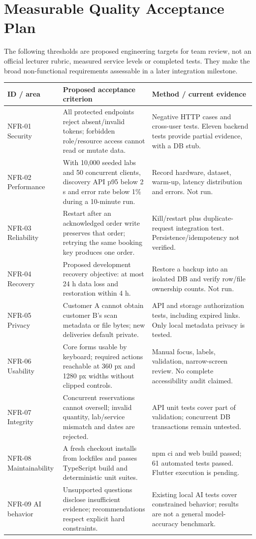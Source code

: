\section{Measurable Quality Acceptance Plan}
The following thresholds are proposed engineering targets for team review,
not an official lecturer rubric, measured service levels or completed tests.
They make the broad non-functional requirements assessable in a later
integration milestone.
\begin{longtable}{p{}p{}p{}}
\toprule\textbf{ID / area} & \textbf{Proposed acceptance criterion} & \textbf{Method / current evidence}\\\midrule\endhead
NFR-01 Security & All protected endpoints reject absent/invalid tokens; forbidden role/resource access cannot read or mutate data. & Negative HTTP cases and cross-user tests. Eleven backend tests provide partial evidence, with a DB stub.\\
NFR-02 Performance & With 10,000 seeded labs and 50 concurrent clients, discovery API p95 below 2 s and error rate below 1\% during a 10-minute run. & Record hardware, dataset, warm-up, latency distribution and errors. Not run.\\
NFR-03 Reliability & Restart after an acknowledged order write preserves that order; retrying the same booking key produces one order. & Kill/restart plus duplicate-request integration test. Persistence/idempotency not verified.\\
NFR-04 Recovery & Proposed development recovery objective: at most 24 h data loss and restoration within 4 h. & Restore a backup into an isolated DB and verify row/file ownership counts. Not run.\\
NFR-05 Privacy & Customer A cannot obtain customer B's scan metadata or file bytes; new deliveries default private. & API and storage authorization tests, including expired links. Only local metadata privacy is tested.\\
NFR-06 Usability & Core forms usable by keyboard; required actions reachable at 360 px and 1280 px widths without clipped controls. & Manual focus, labels, validation, narrow-screen review. No complete accessibility audit claimed.\\
NFR-07 Integrity & Concurrent reservations cannot oversell; invalid quantity, lab/service mismatch and dates are rejected. & API unit tests cover part of validation; concurrent DB transactions remain untested.\\
NFR-08 Maintainability & A fresh checkout installs from lockfiles and passes TypeScript build and deterministic unit suites. & npm ci and web build passed; 61 automated tests passed. Flutter execution is pending.\\
NFR-09 AI behavior & Unsupported questions disclose insufficient evidence; recommendations respect explicit hard constraints. & Existing local AI tests cover constrained behavior; results are not a general model-accuracy benchmark.\\
\bottomrule
\end{longtable}

